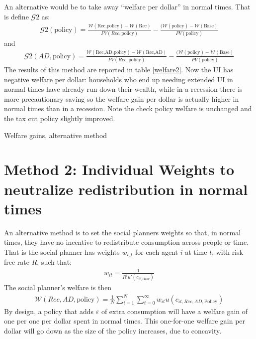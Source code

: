 \documentclass[11pt]{article}
\begin{document}
	An alternative would be to take away ``welfare per dollar'' in normal times. That is define $\mathcal{G}2$ as:
	\begin{align}
	\mathcal{G}2(\text{policy}) = \frac{\mathcal{W}(\text{Rec,policy}) - \mathcal{W}(\text{Rec})}{PV(Rec,\text{policy})}  - \frac{(\mathcal{W}(\text{policy}) - \mathcal{W}(\text{Base}) }{PV(\text{policy})}
\end{align}
and 
	\begin{align}
	\mathcal{G}2(AD,\text{policy}) = \frac{\mathcal{W}(\text{Rec,AD,policy}) - \mathcal{W}(\text{Rec,AD})}{PV(Rec,\text{policy})}  - \frac{(\mathcal{W}(\text{policy}) - \mathcal{W}(\text{Base}) }{PV(\text{policy})}
\end{align}	
The results of this method are reported in table \ref{welfare2}. Now the UI has negative welfare per dollar: households who end up needing extended UI in normal times have already run down their wealth, while in a recession there is more precautionary saving so the welfare gain per dollar is actually higher in normal times than in a recession. Note the check policy welfare is unchanged and the tax cut policy slightly improved.
	\begin{table} 
	\center
	
	\caption{Welfare gains, alternative method}
	\label{welfare2}
\end{table}

	\section{Method 2: Individual Weights to neutralize redistribution in normal times}
	An alternative method is to set the social planners weights so that, in normal times, they have no incentive to redistribute consumption across people or time. That is the social planner has weights $w_{i,t}$ for each agent $i$ at time $t$, with risk free rate $R$, such that:
	\begin{align}
		w_{it} = \frac{1}{R^t u'(c_{it,\text{Base}})}
	\end{align}
	The social planner's welfare is then
	\begin{align}
	\mathcal{W}(Rec,AD,\text{policy}) = \frac{1}{N}\sum_{i=1}^{N} \sum_{t=0}^{\infty} w_{it} u(c_{it,Rec,AD,\text{Policy}})
	\end{align}
	By design, a policy that adds $\varepsilon$ of extra consumption will have a welfare gain of one per one per dollar spent in normal times. This one-for-one welfare gain per dollar will go down as the size of the policy increases, due to concavity.
	
\end{document}
